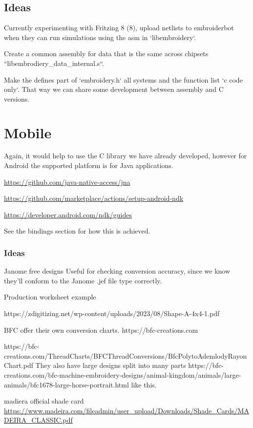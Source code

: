 \documentclass[11pt]{report}
\begin{document}
\section{Ideas}

Currently experimenting with Fritzing 8 (8), upload netlists to embroiderbot when
they can run simulations using the asm in `libembroidery`.

Create a common assembly for data that is the same across chipsets
``libembrodiery\_data\_internal.s``.

Make the defines part of `embroidery.h` all systems and the function list
`c code only`. That way we can share some development between assembly and C versions.

\chapter{Mobile}

Again, it would help to use the C library we have already developed,
however for Android the supported platform is for Java applications.

\url{https://github.com/java-native-access/jna}

\url{https://github.com/marketplace/actions/setup-android-ndk}

\url{https://developer.android.com/ndk/guides}

See the bindings section for how this is achieved.

\subsection{Ideas}

Janome free designs %
Useful for checking conversion accuracy, since we know they'll conform to the
Janome .jef file type correctly.

Production worksheet example

https://zdigitizing.net/wp-content/uploads/2023/08/Shape-A-4x4-1.pdf

BFC offer their own conversion charts.
https://bfc-creations.com

https://bfc-creations.com/ThreadCharts/BFCThreadConversions/BfcPolytoAdemlodyRayonChart.pdf
They also have large designs split into many parts
https://bfc-creations.com/bfc-machine-embroidery-designs/animal-kingdom/animals/large-animals/bfc1678-large-horse-portrait.html
like this.

madiera official shade card
\url{https://www.madeira.com/fileadmin/user_upload/Downloads/Shade_Cards/MADEIRA_CLASSIC.pdf}
\end{document}
